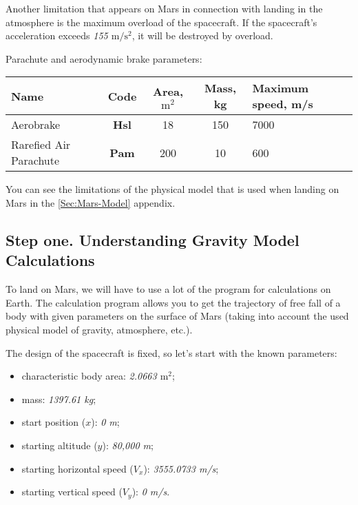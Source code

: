 \documentclass[12pt,a4paper]{article}
\begin{document}
Another limitation that appears on Mars in connection with landing in the atmosphere is the maximum overload of the spacecraft. If the spacecraft's acceleration exceeds \emph{155 $\text{m}/\text{s}^2$}, it will be destroyed by overload.

Parachute and aerodynamic brake parameters:

\begin{center}
\begin{tabular}{ |p{5cm}|c|c|c|p{3cm}| }
   \hline
   \textbf{Name} & \textbf{Code} & \textbf{Area, $\text{m}^2$} & \textbf{Mass, kg} &
   \textbf{Maximum speed, m/s} \\
   \hline
   Aerobrake & \textbf{Hsl} & 18 & 150 & 7000 \\
   \hline
   Rarefied Air Parachute & \textbf{Pam} & 200 & 10 & 600 \\
   \hline
\end{tabular}
\end{center}

You can see the limitations of the physical model that is used when landing on Mars in the \ref{Sec:Mars-Model} appendix.

\subsection{Step one. Understanding Gravity Model Calculations}

To land on Mars, we will have to use a lot of the program for calculations on Earth. The calculation program allows you to get the trajectory of free fall of a body with given parameters on the surface of Mars (taking into account the used physical model of gravity, atmosphere, etc.).

The design of the spacecraft is fixed, so let's start with the known parameters:

\begin{itemize}
   \item characteristic body area: \emph{2.0663 $\text{m}^2$};
   \item mass: \emph{1397.61 kg};
   \item start position ($x$): \emph{0 m};
   \item starting altitude ($y$): \emph{80,000 m};
   \item starting horizontal speed ($V_x$): \emph{3555.0733 m/s};
   \item starting vertical speed ($V_y$): \emph{0 m/s}.
\end{itemize}
\end{document}
